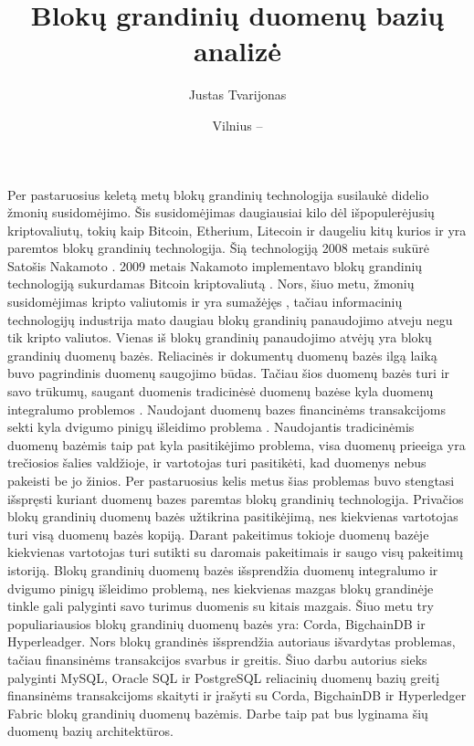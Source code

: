 \documentclass{VUMIFPSkursinis}
\title{Blokų grandinių duomenų bazių analizė }
\author{Justas Tvarijonas}
\date{Vilnius – \the\year}
\begin{document}
\maketitle

\tableofcontents

Per pastaruosius keletą metų blokų grandinių technologija susilaukė didelio žmonių susidomėjimo. 
Šis susidomėjimas daugiausiai kilo dėl išpopulerėjusių kriptovaliutų, tokių kaip Bitcoin, Etherium, Litecoin ir daugeliu kitų 
kurios ir yra paremtos blokų grandinių technologija. Šią technologiją 2008 metais sukūrė Satošis Nakamoto  \cite{BlockChain}. 
2009 metais Nakamoto implementavo blokų grandinių technologiją sukurdamas Bitcoin kriptovaliutą \cite{Bitcoin}. 
Nors, šiuo metu, žmonių susidomėjimas kripto valiutomis ir yra sumažėjęs \cite{Trends}, tačiau informacinių technologijų industrija 
mato daugiau blokų grandinių panaudojimo atveju negu tik kripto valiutos. Vienas iš blokų grandinių panaudojimo atvėjų yra 
blokų grandinių duomenų bazės. Reliacinės ir dokumentų duomenų bazės ilgą laiką buvo pagrindinis duomenų saugojimo būdas. 
Tačiau šios duomenų bazės turi ir savo trūkumų, saugant duomenis tradicinėsė duomenų bazėse kyla duomenų integralumo problemos \cite{Integrity}
. 
Naudojant duomenų bazes financinėms transakcijoms sekti kyla dvigumo pinigų išleidimo problema\cite{Double}
. Naudojantis tradicinėmis duomenų bazėmis 
taip pat kyla pasitikėjimo problema, visa duomenų prieeiga yra trečiosios šalies valdžioje, ir vartotojas turi pasitikėti, kad duomenys nebus pakeisti be jo žinios.
Per pastaruosius kelis metus šias problemas
 buvo stengtasi išspręsti kuriant duomenų bazes paremtas blokų grandinių technologija. Privačios blokų grandinių duomenų bazės užtikrina pasitikėjimą, nes kiekvienas vartotojas turi visą duomenų 
bazės kopiją. Darant pakeitimus tokioje duomenų bazėje kiekvienas vartotojas turi sutikti su daromais pakeitimais ir saugo visų pakeitimų istoriją. Blokų grandinių duomenų bazės išsprendžia duomenų integralumo ir
dvigumo pinigų išleidimo problemą, nes kiekvienas mazgas blokų grandinėje tinkle gali palyginti savo turimus duomenis su kitais mazgais. Šiuo metu try populiariausios blokų grandinių duomenų 
bazės yra: Corda, BigchainDB ir Hyperleadger. Nors blokų grandinės išsprendžia autoriaus išvardytas problemas, tačiau finansinėms transakcijos svarbus ir greitis. Šiuo darbu autorius 
sieks palyginti MySQL, Oracle SQL ir PostgreSQL reliacinių duomenų bazių greitį finansinėms transakcijoms skaityti ir įrašyti su Corda, BigchainDB ir Hyperledger Fabric blokų grandinių duomenų bazėmis.
Darbe taip pat bus lyginama šių duomenų bazių architektūros.
\end{document}
